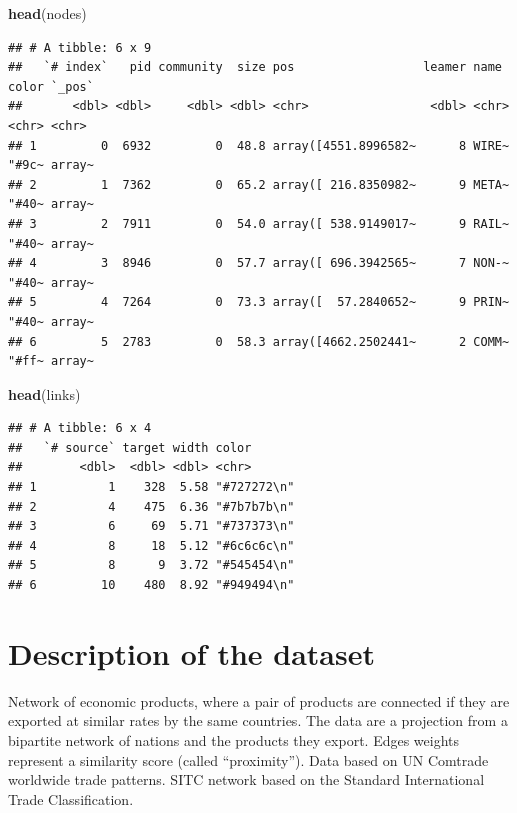 \documentclass[
]{article}
\newenvironment{Shaded}{\begin{snugshade}}{\end{snugshade}}
\newcommand{\FunctionTok}[1]{\textcolor[rgb]{0.13,0.29,0.53}{\textbf{#1}}}
\newcommand{\NormalTok}[1]{#1}
\begin{document}
\begin{Shaded}
\begin{Highlighting}[]
\FunctionTok{head}\NormalTok{(nodes)}
\end{Highlighting}
\end{Shaded}

\begin{verbatim}
## # A tibble: 6 x 9
##   `# index`   pid community  size pos                  leamer name  color `_pos`
##       <dbl> <dbl>     <dbl> <dbl> <chr>                 <dbl> <chr> <chr> <chr> 
## 1         0  6932         0  48.8 array([4551.8996582~      8 WIRE~ "#9c~ array~
## 2         1  7362         0  65.2 array([ 216.8350982~      9 META~ "#40~ array~
## 3         2  7911         0  54.0 array([ 538.9149017~      9 RAIL~ "#40~ array~
## 4         3  8946         0  57.7 array([ 696.3942565~      7 NON-~ "#40~ array~
## 5         4  7264         0  73.3 array([  57.2840652~      9 PRIN~ "#40~ array~
## 6         5  2783         0  58.3 array([4662.2502441~      2 COMM~ "#ff~ array~
\end{verbatim}

\begin{Shaded}
\begin{Highlighting}[]
\FunctionTok{head}\NormalTok{(links)}
\end{Highlighting}
\end{Shaded}

\begin{verbatim}
## # A tibble: 6 x 4
##   `# source` target width color      
##        <dbl>  <dbl> <dbl> <chr>      
## 1          1    328  5.58 "#727272\n"
## 2          4    475  6.36 "#7b7b7b\n"
## 3          6     69  5.71 "#737373\n"
## 4          8     18  5.12 "#6c6c6c\n"
## 5          8      9  3.72 "#545454\n"
## 6         10    480  8.92 "#949494\n"
\end{verbatim}

\section{Description of the dataset}\label{description-of-the-dataset}

Network of economic products, where a pair of products are connected if
they are exported at similar rates by the same countries. The data are a
projection from a bipartite network of nations and the products they
export. Edges weights represent a similarity score (called
``proximity''). Data based on UN Comtrade worldwide trade patterns. SITC
network based on the Standard International Trade Classification.
\end{document}

